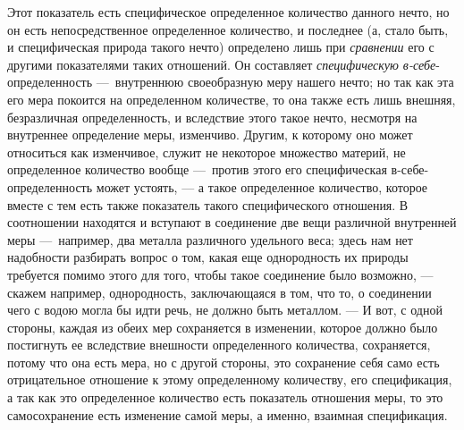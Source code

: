 Этот показатель есть специфическое определенное количество данного нечто, но
он есть непосредственное определенное количество, и последнее (а, стало
быть, и специфическая природа такого нечто) определено лишь при
{\em сравнении} его с другими показателями таких
отношений. Он составляет {\em специфическую
в-себе}{}-определенность —~внутреннюю своеобразную меру нашего нечто; но
так как эта его мера покоится на определенном количестве, то она также есть
лишь внешняя, безразличная определенность, и вследствие этого такое нечто,
несмотря на внутреннее определение меры, изменчиво. Другим, к которому оно
может относиться как изменчивое, служит не некоторое множество материй, не
определенное количество вообще —~против этого его специфическая
в-себе-определенность может устоять, — а такое определенное количество,
которое вместе с тем есть также показатель такого специфического отношения.
В соотношении находятся и вступают в соединение две вещи различной
внутренней меры —~например, два металла различного удельного веса; здесь
нам нет надобности разбирать вопрос о том, какая еще однородность их
природы требуется помимо этого для того, чтобы такое соединение было
возможно, — скажем например, однородность, заключающаяся в том, что то, о
соединении чего с водою могла бы идти речь, не должно быть металлом. — И
вот, с одной стороны, каждая из обеих мер сохраняется в изменении, которое
должно было постигнуть ее вследствие внешности определенного количества,
сохраняется, потому что она есть мера, но с другой стороны, это сохранение
себя само есть отрицательное отношение к этому определенному количеству,
его спецификация, а так как это определенное количество есть показатель
отношения меры, то это самосохранение есть изменение самой меры, а именно,
взаимная спецификация.

